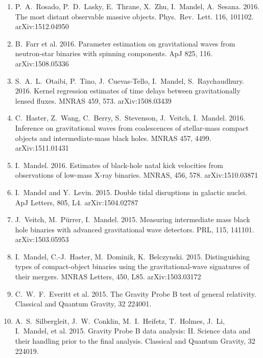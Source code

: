 \documentclass[margin,line]{res}
\begin{document}
\begin{resume}
\begin{enumerate}
\item P.~A.~Rosado, P.~D.~Lasky, E.~Thrane, X.~Zhu, I.~Mandel, A.~Sesana.  2016. The most distant observable massive objects.  Phys.~Rev.~Lett. 116, 101102.  arXiv:1512.04950

\item B.~Farr et al. 2016. Parameter estimation on gravitational waves from neutron-star binaries with spinning components. ApJ 825, 116. arXiv:1508.05336

\item S.~A.~L.~Otaibi, P.~Tino, J.~Cuevas-Tello, I.~Mandel, S.~Raychaudhury.  2016.  Kernel regression estimates of time delays between gravitationally lensed fluxes.  MNRAS 459, 573.  arXiv:1508.03439

\item C.~Haster, Z.~Wang, C.~Berry, S.~Stevenson, J.~Veitch, I.~Mandel.  2016. Inference on gravitational waves from coalescences of stellar-mass compact objects and intermediate-mass black holes.   MNRAS 457, 4499.  arXiv:1511.01431 

\item I.~Mandel. 2016. Estimates of black-hole natal kick velocities from observations of low-mass X-ray binaries. MNRAS, 456, 578. arXiv:1510.03871

\item  I.~Mandel and Y.~Levin.  2015.  Double tidal disruptions in galactic nuclei.  ApJ Letters, 805, L4.  arXiv:1504.02787

\item  J.~Veitch, M.~P\"urrer, I.~Mandel. 2015. Measuring intermediate mass black hole binaries with advanced gravitational wave detectors. PRL, 115, 141101. arXiv:1503.05953 

\item  I.~Mandel, C.-J.~Haster, M.~Dominik, K.~Belczynski.  2015.  Distinguishing types of compact-object binaries using the gravitational-wave signatures of their mergers.  MNRAS Letters, 450, L85. arXiv:1503.03172

\item C.~W.~F.~Everitt et al.  2015.  The Gravity Probe B test of general relativity.  Classical and Quantum Gravity, 32 224001.

\item A.~S.~Silbergleit, J.~W.~Conklin, M.~I.~Heifetz, T.~Holmes, J.~Li, I.~Mandel, et al. 2015.
Gravity Probe B data analysis: II. Science data and their handling prior to the final analysis.  Classical and Quantum Gravity, 32 224019.


\end{enumerate}
\end{resume}
\end{document}
